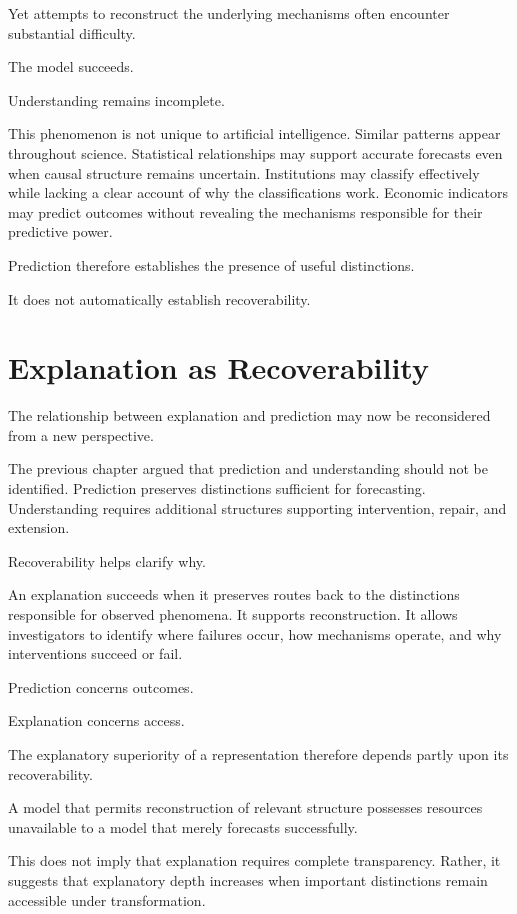 \documentclass[11pt,oneside,openany]{book}
\begin{document}
Yet attempts to reconstruct the underlying mechanisms often encounter substantial difficulty.

The model succeeds.

Understanding remains incomplete.

This phenomenon is not unique to artificial intelligence. Similar patterns appear throughout science. Statistical relationships may support accurate forecasts even when causal structure remains uncertain. Institutions may classify effectively while lacking a clear account of why the classifications work. Economic indicators may predict outcomes without revealing the mechanisms responsible for their predictive power.

Prediction therefore establishes the presence of useful distinctions.

It does not automatically establish recoverability.

\section{Explanation as Recoverability}

The relationship between explanation and prediction may now be reconsidered from a new perspective.

The previous chapter argued that prediction and understanding should not be identified. Prediction preserves distinctions sufficient for forecasting. Understanding requires additional structures supporting intervention, repair, and extension.

Recoverability helps clarify why.

An explanation succeeds when it preserves routes back to the distinctions responsible for observed phenomena. It supports reconstruction. It allows investigators to identify where failures occur, how mechanisms operate, and why interventions succeed or fail.

Prediction concerns outcomes.

Explanation concerns access.

The explanatory superiority of a representation therefore depends partly upon its recoverability.

A model that permits reconstruction of relevant structure possesses resources unavailable to a model that merely forecasts successfully.

This does not imply that explanation requires complete transparency. Rather, it suggests that explanatory depth increases when important distinctions remain accessible under transformation.
\end{document}
